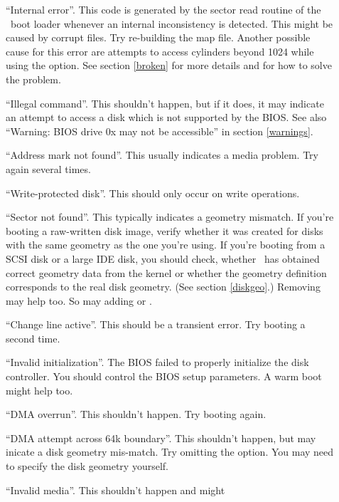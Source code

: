 \begin{description}
  \item[] ``Internal error''. This code is generated by
    the sector read routine of the \LILO\ boot loader whenever an
    internal inconsistency is detected. This might be caused by corrupt
    files. Try re-building the map file. Another possible cause for this
    error are attempts to access cylinders beyond 1024 while using the
     option. See section \ref{broken} for more details and
    for how to solve the problem.
  \item[] ``Illegal command''. This shouldn't happen, but if it
    does, it may indicate an attempt to access a disk which is not supported
    by the BIOS. See also ``Warning: BIOS drive 0x may not be
    accessible'' in section \ref{warnings}.
  \item[] ``Address mark not found''. This usually indicates
    a media problem. Try again several times.
  \item[] ``Write-protected disk''. This should only occur on
    write operations.
  \item[] ``Sector not found''. This typically indicates a
    geometry mismatch. If you're booting a raw-written disk image, verify
    whether it was created for disks with the same geometry as the one
    you're using. If you're booting from a SCSI disk or a large IDE disk,
    you should check,
    whether \LILO\ has obtained correct geometry data from the kernel or
    whether the geometry definition corresponds
    to the real disk geometry. (See section \ref{diskgeo}.) Removing
     may help too. So may adding  or .
  \item[] ``Change line active''. This should be a transient
    error. Try booting a second time.
  \item[] ``Invalid initialization''. The BIOS failed to properly
    initialize the disk controller. You should control the BIOS setup
    parameters. A warm boot might help too.
  \item[] ``DMA overrun''. This shouldn't happen. Try booting
    again.
  \item[] ``DMA attempt across 64k boundary''. This shouldn't
    happen, but may inicate a disk geometry mis-match. Try omitting 
    the  option. You may need to specify the disk geometry 
    yourself.
  \item[] ``Invalid media''. This shouldn't happen and might

\end{description}
